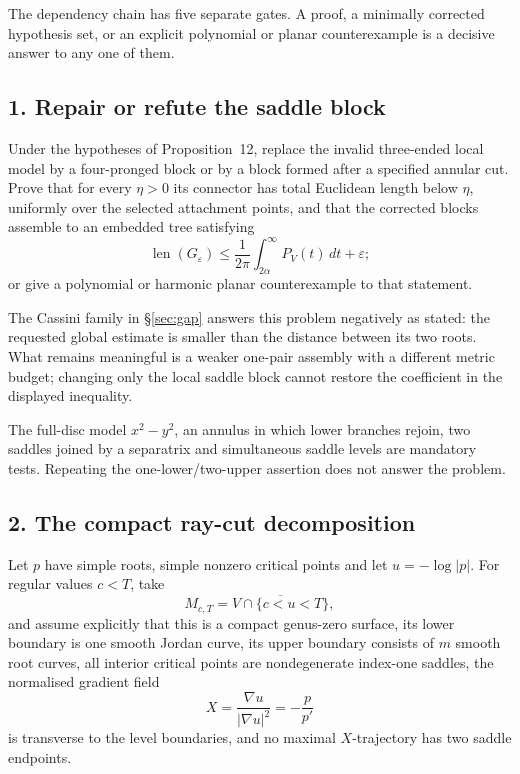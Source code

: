 \documentclass[11pt]{article}
\begin{document}
The dependency chain has five separate gates.  A proof, a minimally corrected
hypothesis set, or an explicit polynomial or planar counterexample is a
decisive answer to any one of them.

\subsection*{1. Repair or refute the saddle block}

\begin{problem}\label{prob:saddle1041}
Under the hypotheses of Proposition~12, replace the invalid three-ended local
model by a four-pronged block or by a block formed after a specified annular
cut.  Prove that for every $\eta>0$ its connector has total Euclidean length
below $\eta$, uniformly over the selected attachment points, and that the
corrected blocks assemble to an embedded tree satisfying
\[
 \operatorname{len}(G_\varepsilon)
 \le\frac1{2\pi}\int_{2\alpha}^{\infty}P_V(t)\,dt+\varepsilon;
\]
or give a polynomial or harmonic planar counterexample to that statement.
\end{problem}

The Cassini family in \S\ref{sec:gap} answers this problem negatively as
stated: the requested global estimate is smaller than the distance between its
two roots.  What remains meaningful is a weaker one-pair assembly with a
different metric budget; changing only the local saddle block cannot restore
the coefficient in the displayed inequality.

The full-disc model $x^2-y^2$, an annulus in which lower branches rejoin, two
saddles joined by a separatrix and simultaneous saddle levels are mandatory
tests.  Repeating the one-lower/two-upper assertion does not answer the
problem.

\subsection*{2. The compact ray-cut decomposition}

Let $p$ have simple roots, simple nonzero critical points and let
$u=-\log|p|$.  For regular values $c<T$, take
\[
 M_{c,T}=\overline{V\cap\{c<u<T\}},
\]
and assume explicitly that this is a compact genus-zero surface, its lower
boundary is one smooth Jordan curve, its upper boundary consists of $m$ smooth
root curves, all interior critical points are nondegenerate index-one saddles,
the normalised gradient field
\[
 X=\frac{\nabla u}{|\nabla u|^2}=-\frac{p}{p'}
\]
is transverse to the level boundaries, and no maximal $X$-trajectory has two
saddle endpoints.
\end{document}
